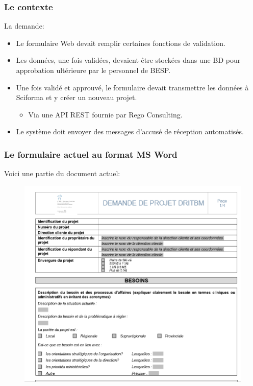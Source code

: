 \documentclass[aspectratio=169]{beamer}%
\let\note\relax
\begin{document}
\begin{frame}
\frametitle{Le contexte}
La demande:	
\begin{itemize}%
	\item Le formulaire Web devait remplir certaines fonctions de validation.
	\item Les données, une fois validées, devaient être stockées dans une BD pour approbation ultérieure par le personnel de BESP.
	\item Une fois validé et approuvé, le formulaire devait transmettre les données à Sciforma et y créer un nouveau projet.
	\begin{itemize}
		\item Via une API REST fournie par Rego Consulting.
	\end{itemize}
	\item Le système doit envoyer des messages d'accusé de réception automatisés.
\end{itemize}

\end{frame}


\begin{frame}
\transwipe 
\frametitle{Le formulaire actuel au format MS Word}
Voici une partie du document actuel:
\begin{figure}
\includegraphics[scale=0.25]{oldForm}
\end{figure}
\end{frame}
\end{document}
